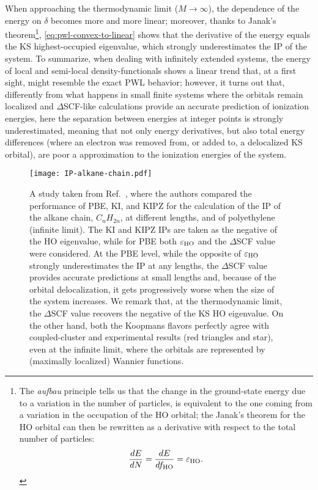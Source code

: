 %
When approaching the thermodynamic limit ($M\longrightarrow \infty$), the dependence of the energy on $\delta$ becomes more and more linear; moreover, thanks to Janak's theorem\footnote{The \emph{aufbau} principle tells us that the change in the ground-state energy due to a variation in the number of particles, is equivalent to the one coming from a variation in the occupation of the HO orbital; the Janak's theorem for the HO orbital can then be rewritten as a derivative with respect to the total number of particles:
\begin{equation*}
    \frac{dE}{dN} = \frac{dE}{df_{\rm HO}} = \varepsilon_{\rm HO} .
\end{equation*}
}, 
\cref{eq:pwl-convex-to-linear} shows that the derivative of the energy equals the KS highest-occupied eigenvalue, which strongly underestimates the IP of the system. To summarize, when dealing with infinitely extended systems, the energy of local and semi-local density-functionals shows a linear trend that, at a first sight, might resemble the exact PWL behavior; however, it turns out that, differently from what happens in small finite systems where the orbitals remain localized and $\Delta$SCF-like calculations provide an accurate prediction of ionization energies, here the separation between energies at integer points is strongly underestimated, meaning that not only energy derivatives, but also total energy differences (where an electron was removed from, or added to, a delocalized KS orbital), are poor a approximation to the ionization energies of the system.

\begin{figure}
    \centering
    \texttt{[image: IP-alkane-chain.pdf]}
    \caption[PBE, KI, and KIPZ IPs for the alkane chain.]{A study taken from Ref.~\cite{nguyen_koopmans-compliant_2018}, where the authors compared the performance of PBE, KI, and KIPZ for the calculation of the IP of the alkane chain, $C_n H_{2n}$, at different lengths, and of polyethylene (infinite limit). The KI and KIPZ IPs are taken as the negative of the HO eigenvalue, while for PBE both $\varepsilon_{\rm HO}$ and the $\Delta$SCF value were considered. At the PBE level, while the opposite of $\varepsilon_{\rm HO}$ strongly underestimates the IP at any lengths, the $\Delta$SCF value provides accurate predictions at small lengths and, because of the orbital delocalization, it gets progressively worse when the size of the system increases. We remark that, at the thermodynamic limit, the $\Delta$SCF value recovers the negative of the KS HO eigenvalue. On the other hand, both the Koopmans flavors perfectly agree with coupled-cluster and experimental results (red triangles and star), even at the infinite limit, where the orbitals are represented by (maximally localized) Wannier functions.}
    \label{fig:ip-alkane-chain}
\end{figure}

